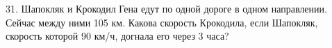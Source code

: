 31. Шапокляк и Крокодил Гена едут по одной дороге в одном направлении. Сейчас между ними 105 км. Какова скорость Крокодила, если Шапокляк, скорость которой 90 км/ч, догнала его через 3 часа?\\

